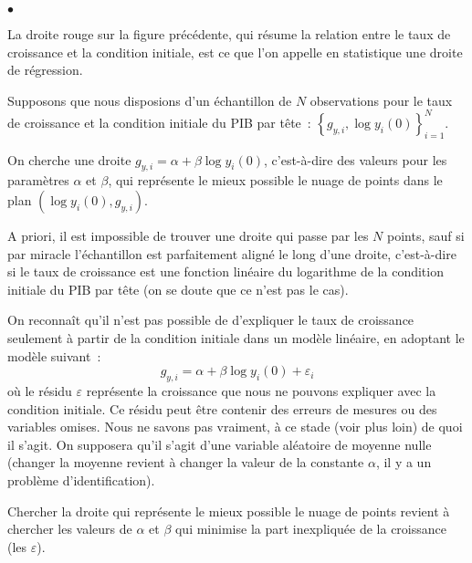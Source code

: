 \documentclass[10pt,notheorems]{beamer}
\theoremstyle{plain}
\theoremstyle{definition} %
\begin{document}
\begin{notes}

  \begin{list}{$\bullet$}{}

  \item La droite rouge sur la figure précédente, qui résume la relation entre
    le taux de croissance et la condition initiale, est ce que l'on appelle en
    statistique une droite de régression.\newline

  \item Supposons que nous disposions d'un échantillon de $N$ observations pour
    le taux de croissance et la condition initiale du PIB par tête~:
    $\left\{g_{y,i}, \log y_i(0)\right\}_{i=1}^N$.\newline

  \item On cherche une droite $g_{y,i} = \alpha + \beta \log y_i(0)$,
    c'est-à-dire des valeurs pour les paramètres $\alpha$ et $\beta$, qui
    représente le mieux possible le nuage de points dans le plan
    $\left(\log y_i(0), g_{y,i}\right)$.\newline

  \item A priori, il est impossible de trouver une droite qui passe par les $N$
    points, sauf si par miracle l'échantillon est parfaitement aligné le long
    d'une droite, c'est-à-dire si le taux de croissance est une fonction
    linéaire du logarithme de la condition initiale du PIB par tête (on se doute
    que ce n'est pas le cas).

  \item On reconnaît qu'il n'est pas possible de d'expliquer le taux de
    croissance seulement à partir de la condition initiale dans un modèle
    linéaire, en adoptant le modèle suivant~:
    \[
      g_{y,i} = \alpha + \beta \log y_i(0) + \varepsilon_i
    \]
    où le résidu $\varepsilon$ représente la croissance que nous ne pouvons
    expliquer avec la condition initiale. Ce résidu peut être contenir des
    erreurs de mesures ou des variables omises. Nous ne savons pas vraiment, à
    ce stade (voir plus loin) de quoi il s'agit. On supposera qu'il s'agit d'une
    variable aléatoire de moyenne nulle (changer la moyenne revient à changer la
    valeur de la constante $\alpha$, il y a un problème d'identification).\newline

  \item Chercher la droite qui représente le mieux possible le nuage de points
    revient à chercher les valeurs de $\alpha$ et $\beta$ qui minimise la part
    inexpliquée de la croissance (les $\varepsilon$).\newline


\end{list}
\end{notes}
\end{document}
